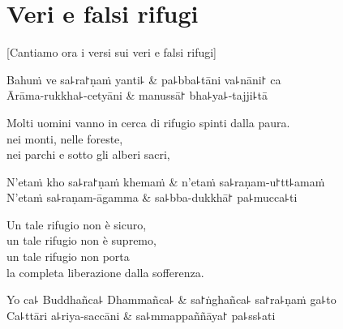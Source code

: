 \chapter{Veri e falsi rifugi}


\begin{leader}
\end{leader}


\begin{english}
  [Cantiamo ora i versi sui veri e falsi rifugi]
\end{english}

\begin{twochants}
  Bahuṁ ve sa꜕ra꜓ṇaṁ yanti꜕ & pa꜕bba꜕tāni va꜕nāni꜓ ca \\
  Ārāma-rukkha꜕-cetyāni & manussā꜓ bha꜕ya꜕-tajji꜕tā \\
\end{twochants}

\begin{english}
Molti uomini vanno in cerca di rifugio spinti dalla paura.\\
nei monti, nelle foreste,\\
nei parchi e sotto gli alberi sacri,
\end{english}

\begin{twochants}
  N'etaṁ kho sa꜕ra꜓ṇaṁ khemaṁ & n'etaṁ sa꜕raṇam-u꜓tt꜕amaṁ \\
  N'etaṁ sa꜕raṇam-āgamma & sa꜕bba-dukkhā꜓ pa꜕mucca꜕ti \\
\end{twochants}

\begin{english}
  Un tale rifugio non è sicuro,\\
  un tale rifugio non è supremo,\\
  un tale rifugio non porta\\
  la completa liberazione dalla sofferenza.
\end{english}

\begin{twochants}
  Yo ca꜕ Buddhañca꜕ Dhammañca꜕ & sa꜓ṅghañca꜕ sa꜓ra꜕ṇaṁ ga꜕to \\
  Ca꜕ttāri a꜕riya-saccāni & sa꜕mmappaññāya꜓ pa꜕ss꜕ati \\
\end{twochants}


